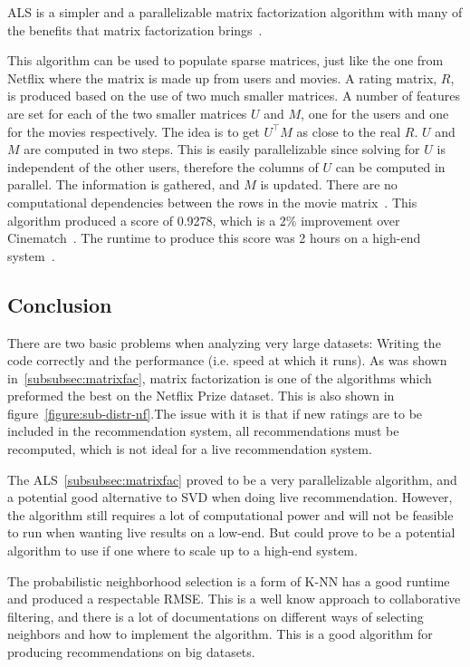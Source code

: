ALS is a simpler and a parallelizable matrix factorization algorithm with many of the benefits that matrix factorization brings~\cite{predusingmatrix}.

This algorithm can be used to populate sparse matrices, just like the one from Netflix where the matrix is made up from users and movies. A rating matrix, $R$, is produced based on the use of two much smaller matrices. A number of features are set for each of the two smaller matrices $U$ and $M$, one for the users and one for the movies respectively. The idea is to get $U^\top M$ as close to the real $R$. $U$ and $M$ are computed in two steps. This is easily parallelizable since solving for $U$ is independent of the other users, therefore the columns of $U$ can be computed in parallel. The information is gathered, and $M$ is updated. There are no computational dependencies between the rows in the movie matrix~\cite{myrrix}. This algorithm produced a score of 0.9278, which is a 2\% improvement over Cinematch~\cite{predusingmatrix}. The runtime to produce this score was 2 hours on a high-end system~\cite{alsMPI}.


\subsection{Conclusion}\label{subsec:sim-sys-conc}
There are two basic problems when analyzing very large datasets: Writing the code correctly and the performance (i.e. speed at which it runs). As was shown in~\ref{subsubsec:matrixfac}, matrix factorization is one of the algorithms which preformed the best on the Netflix Prize dataset. This is also shown in figure~\ref{figure:sub-distr-nf}.The issue with it is that if new ratings are to be included in the recommendation system,  all recommendations must be recomputed, which is not ideal for a live recommendation system.

The ALS~\ref{subsubsec:matrixfac} proved to be a very parallelizable algorithm, and a potential good alternative to SVD when doing live recommendation. However, the algorithm still requires a lot of computational power and will not be feasible to run when wanting live results on a low-end. But could prove to be a potential algorithm to use if one where to scale up to a high-end system.

The probabilistic neighborhood selection is a form of K-NN has a good runtime and produced a respectable RMSE. This is a well know approach to collaborative filtering, and there is a lot of documentations on different ways of selecting neighbors and how to implement the algorithm. This is a good algorithm for producing recommendations on big datasets.



